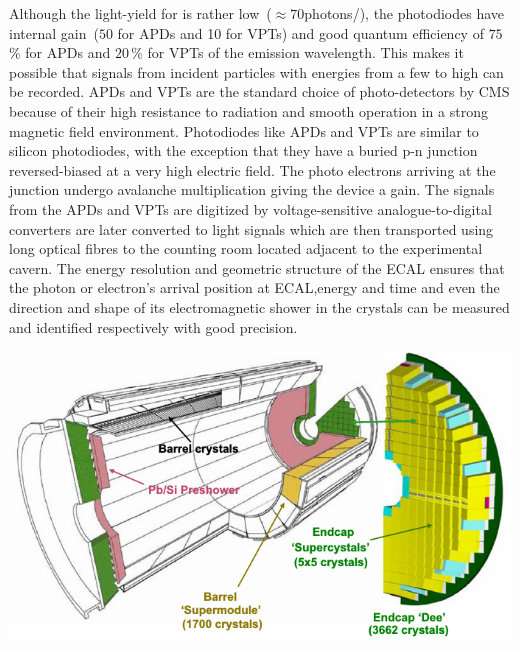 Although the light-yield for \pb is rather low~($\approx 70$photons/\MeV), the photodiodes have internal gain~($50$ for APDs and 10 for VPTs) and good quantum efficiency
of $75$\,\% for APDs and $20$\,\% for VPTs of the emission wavelength. This makes it possible that signals 
from incident particles with energies from a few to high \GeV can be recorded.
APDs and VPTs are the standard choice of photo-detectors by CMS because of their high resistance to radiation and smooth operation in a strong magnetic field environment. Photodiodes like APDs and VPTs are similar to silicon photodiodes, with the exception that they have a buried p-n junction reversed-biased at a very high electric field. The photo electrons arriving at the junction undergo avalanche multiplication giving the device a gain.
The signals from the APDs and VPTs are digitized by voltage-sensitive analogue-to-digital converters are later converted to light signals which are then transported using long optical fibres to the counting room located adjacent to the experimental cavern.
\newline
The energy resolution and geometric structure of the ECAL ensures that the photon or electron's arrival position at ECAL,energy and time and even the direction and shape of its electromagnetic shower in the crystals can be measured and identified respectively with good precision.

\begin{center}\label{CMSECAL}
\centering
\mbox{\includegraphics[scale=0.6]{THESISPLOTS/CMS-ECAL-EB-EE.png}}
\label{fig:CMSECAL}
\end{center}






